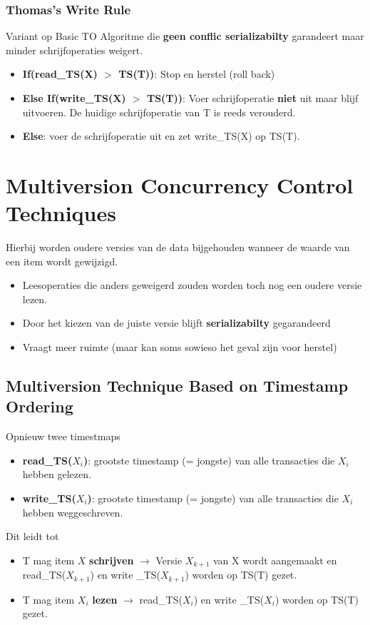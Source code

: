 \subsubsection{Thomas's Write Rule}
Variant op Basic TO Algoritme die \textbf{geen conflic serializabilty} garandeert maar minder schrijfoperaties weigert.
\begin{itemize}
	\item \textbf{If(read\_TS(X) $>$ TS(T))}: Stop en herstel (roll back)
	\item \textbf{Else If(write\_TS(X) $>$ TS(T))}: Voer schrijfoperatie \textbf{niet} uit maar blijf uitvoeren. De huidige schrijfoperatie van T is reeds verouderd.
	\item \textbf{Else}: voer de schrijfoperatie uit en zet write\_TS(X) op TS(T).
\end{itemize}



\section{Multiversion Concurrency Control Techniques}%
Hierbij worden oudere versies van de data bijgehouden wanneer de waarde van een item wordt gewijzigd. 
\begin{itemize}
	\item Leesoperaties die anders geweigerd zouden worden toch nog een oudere versie lezen.
	\item Door het kiezen van de juiste versie blijft \textbf{serializabilty} gegarandeerd
	\item Vraagt meer ruimte (maar kan soms sowieso het geval zijn voor herstel)
\end{itemize}


\subsection{Multiversion Technique Based on Timestamp Ordering}%
Opnieuw twee timestmaps
\begin{itemize}
	\item \textbf{read\_TS($X_i$)}: grootste timestamp (= jongste) van alle transacties die $X_i$ hebben gelezen.
	\item \textbf{write\_TS($X_i$)}: grootste timestamp (= jongste) van alle transacties die $X_i$ hebben weggeschreven.
\end{itemize}
Dit leidt tot 
\begin{itemize}
	\item T mag item $X$ \textbf{schrijven} $\rightarrow$ Versie $X_{k+1}$ van X wordt aangemaakt en read\_TS($X_{k+1}$) en write \_TS($X_{k+1}$) worden op TS(T) gezet.
	\item T mag item $X_i$ \textbf{lezen} $\rightarrow$ read\_TS($X_{i}$) en write \_TS($X_{i}$) worden op TS(T) gezet.
\end{itemize}
